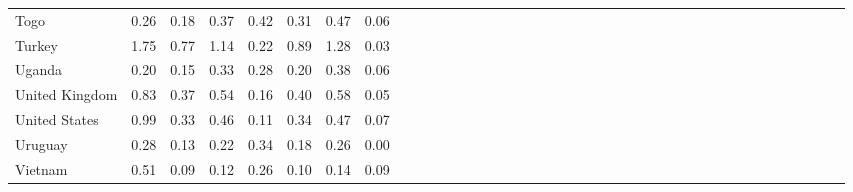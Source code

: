 \begin{ThreePartTable}
\begin{longtable}[t]{l|r|rrrl|r|rrrl|r|rrrl|r|rrrl|r|rrrl|r|rrrl|r|rrrl|r|rrr}
Togo & 0.26 & 0.18 & 0.37 & 0.42 & 0.31 & 0.47 & 0.06\\
Turkey & 1.75 & 0.77 & 1.14 & 0.22 & 0.89 & 1.28 & 0.03\\
Uganda & 0.20 & 0.15 & 0.33 & 0.28 & 0.20 & 0.38 & 0.06\\
United Kingdom & 0.83 & 0.37 & 0.54 & 0.16 & 0.40 & 0.58 & 0.05\\
United States & 0.99 & 0.33 & 0.46 & 0.11 & 0.34 & 0.47 & 0.07\\
Uruguay & 0.28 & 0.13 & 0.22 & 0.34 & 0.18 & 0.26 & 0.00\\
Vietnam & 0.51 & 0.09 & 0.12 & 0.26 & 0.10 & 0.14 & 0.09\\*
\end{longtable}
\end{ThreePartTable}
\endgroup{}
